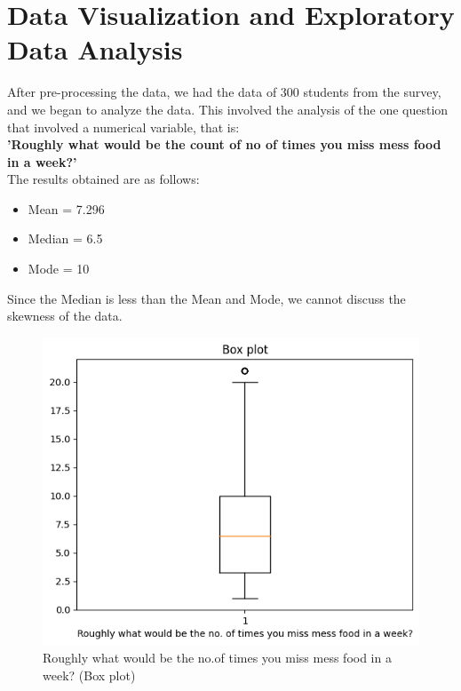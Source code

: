 \documentclass{article}
\begin{document}
\section{Data Visualization and Exploratory Data Analysis}
After pre-processing the data, we had the data of 300 students from the survey, and we began to analyze the data. This involved the analysis of the one question that involved a numerical variable, that is:\\
\textbf{'Roughly what would be the count of no of times you miss mess food in a week?'}\\
The results obtained are as follows:
\begin{itemize}
    \item Mean = 7.296
    \item Median = 6.5
    \item Mode = 10
\end{itemize}
Since the Median is less than the Mean and Mode, we cannot discuss the skewness of the data.
\begin{figure}[H]
    \centering
    \includegraphics[scale = 1]{boxplot.png}
    \caption{Roughly what would be the no.of times you miss mess food in a week? (Box plot)}  
    \label{fig:boxplot}
\end{figure}
\end{document}
